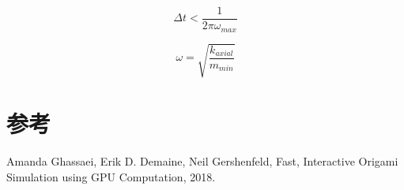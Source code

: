 \documentclass{ctexart}
\begin{document}
\begin{equation}
    \Delta t < \frac{1}{2 \pi \omega_{max}}
\end{equation}

\begin{equation}
    \omega = \sqrt{\frac{k_{axial}}{m_{min}}}
\end{equation}

\section{参考}
\begin{thebibliography}{99}  
Amanda Ghassaei, Erik D. Demaine, Neil Gershenfeld, Fast, Interactive Origami Simulation using GPU Computation, 2018.

\end{thebibliography}
\end{document}
